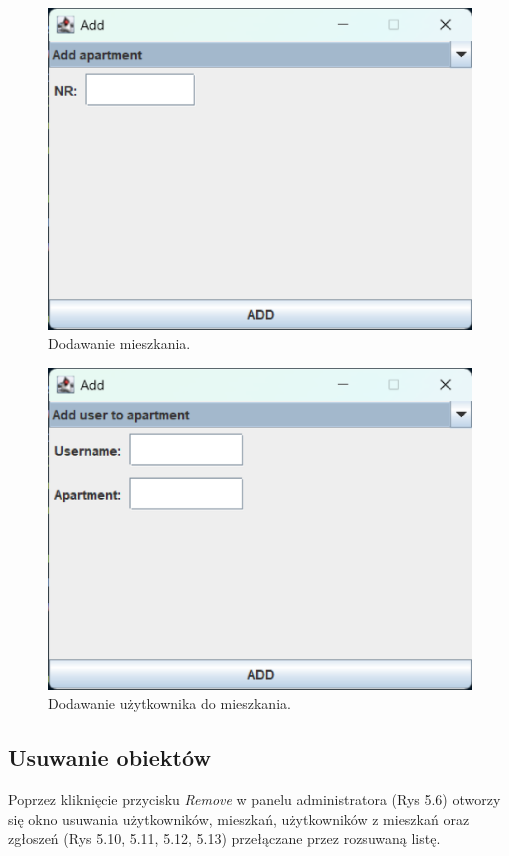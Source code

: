 \begin{figure}[H]
    \centering
    \includegraphics[width=\textwidth,height=0.2\textheight,keepaspectratio]{figures/app-images/Add/add-apartment.eps}
    \caption{Dodawanie mieszkania.\label{fig13}}
\end{figure}

\begin{figure}[H]
    \centering
    \includegraphics[width=\textwidth,height=0.2\textheight,keepaspectratio]{figures/app-images/Add/add-user-to-apartment.eps}
    \caption{Dodawanie użytkownika do mieszkania.\label{fig14}}
\end{figure}

\newpage
\subsection{Usuwanie obiektów}
Poprzez kliknięcie przycisku \textit{Remove} w panelu administratora (Rys 5.6) otworzy się okno usuwania użytkowników, mieszkań, 
użytkowników z mieszkań oraz zgłoszeń (Rys 5.10, 5.11, 5.12, 5.13) przełączane przez rozsuwaną listę.

